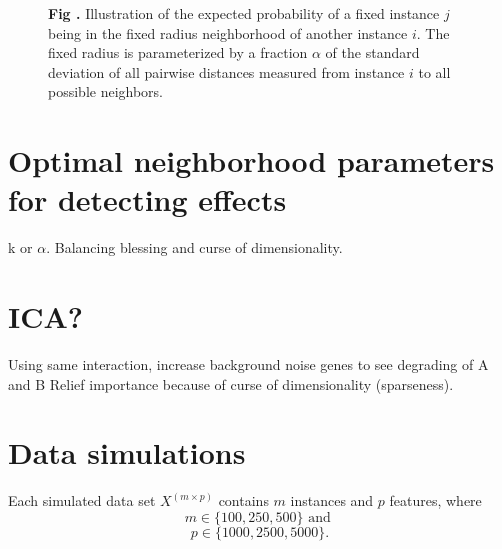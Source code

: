 \documentclass[10pt,letterpaper]{article}\usepackage[]{graphicx}\usepackage[]{color}
\begin{document}
\begin{figure}[ht!]
\centering
\begin{minipage}[h]{0.7\textwidth}
\end{minipage}%
\begin{minipage}[h]{0.3\textwidth}
\noindent{}\textbf{Fig \thefigure \label{fig:gaussPlot}.} Illustration of the expected probability of a fixed instance $j$ being in the fixed radius neighborhood of another instance $i$. The fixed radius is parameterized by a fraction $\alpha$ of the standard deviation of all pairwise distances measured from instance $i$ to all possible neighbors.
\end{minipage}
\end{figure} 

\section{Optimal neighborhood parameters for detecting effects}\label{sec:optim-k}
k or $\alpha$. 
Balancing blessing and curse of dimensionality.


\section{ICA?}

Using same interaction, increase background noise genes to see degrading of A and B Relief importance because of curse of dimensionality (sparseness).  

\section{Data simulations}\label{sec:sim_methods}

Each simulated data set $X^{(m \times p)}$ contains $m$ instances and $p$ features, where
\begin{equation}\label{eq:instance_dims}
m \in \{100, 250, 500\} \text{ and }
\end{equation}
\begin{equation}\label{eq:feature_dims}
p \in \{1000,2500,5000\}.
\end{equation}
\end{document}
